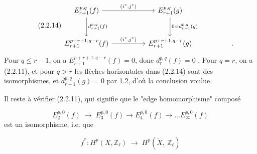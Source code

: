 \begin{equation}\tag{2.2.14}
\begin{tikzcd}[column sep=huge, row sep=large]
E_{r+1}^{p,q}(f) \arrow[r, "{(i^*,j^*)}"] \arrow[d, "{d_{r+1}^{p,q}(f)}"] & E_{r+1}^{p,q}(g) \arrow[d, "{0 = d_{r+1}^{p,q}(g)}"] \\
E_{r+1}^{p+r+1,q-r}(f) \arrow[r, "{(i^*,j^*)}"] & E_{r+1}^{p+r+1,q-r}(g) & .
\end{tikzcd}
\end{equation}
Pour $q \leq r-1$, on a $E_{r+1}^{p+r+1,q-r}(f) = 0$, donc $d_r^{p,q}(f) = 0$ . Pour $q = r$, on a (2.2.11), et pour $q > r$ les flèches horizontales dans (2.2.14) sont des isomorphismes, et $d_{r+1}^{p,q}(g)= 0$ par 1.2, d'où la conclusion voulue.

Il reste à vérifier (2.2.11), qui signifie que le "edge homomorphisme" composé

\begin{equation}\tag{2.2.15}
E_2^{p,0}(f) \;\longrightarrow\; E_3^{p,0}(f) \longrightarrow E_4^{p,0}(f) \longrightarrow \ldots E_\infty^{p,0}(f)
\end{equation}
est un isomorphisme, i.e. que

\begin{equation}\tag{2.2.16}
f^* : H^p(X,\mathbb{Z}_\ell) \;\longrightarrow\; H^p(\widetilde{X},\ \mathbb{Z}_\ell) 
\end{equation}

